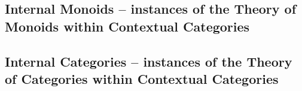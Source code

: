 \documentclass[10pt,a4paper]{article}
\theoremstyle{remark}
\begin{document}
\subsection{Internal Monoids -- instances of the Theory of Monoids within Contextual Categories}
\label{monoidsinstanceexample} 
 

\subsection{Internal Categories -- instances of the Theory of Categories within Contextual Categories}
\label{categoriesinstanceexample}

\fi

%

% 


\end{document}
